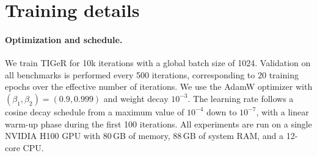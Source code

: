 \begin{table}[t]
\centering
\setlength{\aboverulesep}{0pt}
\setlength{\belowrulesep}{0pt}
\caption{\textbf{Time prediction with additional baselines}. We train and test TICL~\cite{lin2025what} on our proposed dataset, closely adhering to the training protocol outlined by the authors.}
\label{tab:ticl-baseline}
\begingroup
\setlength{\tabcolsep}{1pt}
\endgroup
\end{table}



\section{Training details}
\label{sup:training-details}

\paragraph{Optimization and schedule.}
We train TIGeR for 10k iterations with a global batch size of 1024. 
Validation on all benchmarks is performed every 500 iterations, corresponding to 20 training epochs over the effective number of iterations.
We use the AdamW optimizer with $(\beta_1,\beta_2) = (0.9, 0.999)$ and weight decay $10^{-3}$.
The learning rate follows a cosine decay schedule from a maximum value of $10^{-4}$ down to $10^{-7}$, with a linear warm-up phase during the first 100 iterations.
All experiments are run on a single NVIDIA H100 GPU with 80\,GB of memory, 88\,GB of system RAM, and a 12-core CPU.

